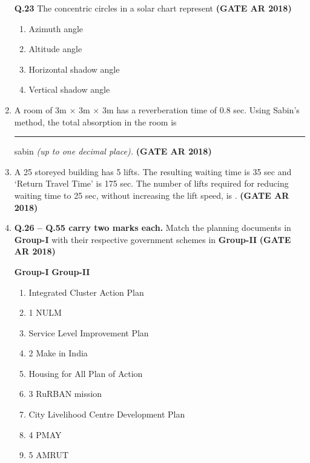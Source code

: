 \documentclass[journal,15pt,onecolumn]{IEEEtran}
\theoremstyle{remark}
\begin{document}
\begin{enumerate}
\textbf{Q.23} \hspace{0.3cm} The concentric circles in a solar chart represent\hfill \textbf{ (GATE AR 2018)}\hfill

\begin{enumerate}
\item    Azimuth angle \item     Altitude angle 
 \item     Horizontal shadow angle \item    Vertical shadow angle 
\end{enumerate}

\item 
A room of 3m $\times$ 3m $\times$ 3m has a reverberation time of 0.8 sec. Using Sabin's method, the total absorption in the room is \rule{4cm}{0.15mm} sabin \textit{(up to one decimal place).} \hfill \textbf{ (GATE AR 2018)}

\vspace*{1cm} 

\item 
A 25 storeyed building has 5 lifts. The resulting waiting time is 35 sec and `Return Travel Time' is 175 sec. The number of lifts required for reducing waiting time to 25 sec, without increasing the lift speed, is \underline{\hspace{3cm}}.\hfill \textbf{ (GATE AR 2018)}
\vspace{1.5cm}

 

\item 
\textbf{Q.26 -- Q.55 carry two marks each.}
 Match the planning documents in \textbf{Group-I} with their respective government schemes in \textbf{Group-II} \hfill \textbf{ (GATE AR 2018)}

\vspace{0.5cm}

\hspace{2.5cm}\textbf{Group-I} \hspace{8cm} \textbf{Group-II} 

\begin{enumerate}
\item      Integrated Cluster Action Plan   \item  1  NULM 
\item      Service Level Improvement Plan   \item 2 Make in India
\item       Housing for All Plan of Action   \item  3  RuRBAN mission 
\item       City Livelihood Centre Development Plan   \item  4  PMAY                                                    \item 5  AMRUT 
\end{enumerate}
 

\end{enumerate}
\end{document}
